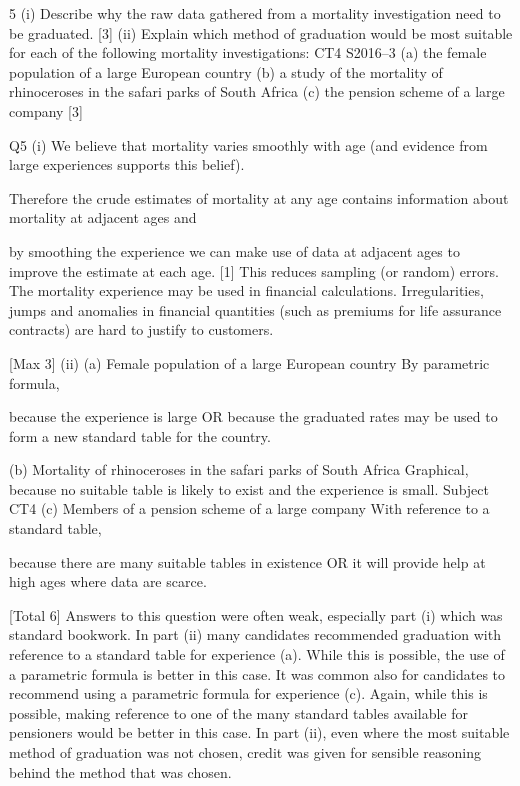 5
(i) Describe why the raw data gathered from a mortality investigation need to be
graduated.
[3]
(ii) Explain which method of graduation would be most suitable for each of the
following mortality investigations:
CT4 S2016–3
(a) the female population of a large European country
(b) a study of the mortality of rhinoceroses in the safari parks of South
Africa
(c) the pension scheme of a large company
[3]



Q5
(i)
We believe that mortality varies smoothly with age (and evidence from large
experiences supports this belief).

Therefore the crude estimates of mortality at any age contains information about
mortality at adjacent ages and

by smoothing the experience we can make use of data at adjacent ages to improve the
estimate at each age.
[1]
This reduces sampling (or random) errors. 
The mortality experience may be used in financial calculations. 
Irregularities, jumps and anomalies in financial quantities (such as premiums for life
assurance contracts) are hard to justify to customers.

[Max 3]
(ii)
(a)
Female population of a large European country
By parametric formula,

because the experience is large
OR because the graduated rates may be used to form a new standard table for
the country.

(b)
Mortality of rhinoceroses in the safari parks of South Africa
Graphical, 
because no suitable table is likely to exist and the experience is small. Subject CT4 %
(c)
Members of a pension scheme of a large company
With reference to a standard table,

because there are many suitable tables in existence
OR it will provide help at high ages where data are scarce.

[Total 6]
Answers to this question were often weak, especially part (i) which was
standard bookwork. In part (ii) many candidates recommended graduation
with reference to a standard table for experience (a). While this is possible,
the use of a parametric formula is better in this case. It was common also for
candidates to recommend using a parametric formula for experience (c).
Again, while this is possible, making reference to one of the many standard
tables available for pensioners would be better in this case. In part (ii), even
where the most suitable method of graduation was not chosen, credit was
given for sensible reasoning behind the method that was chosen.
